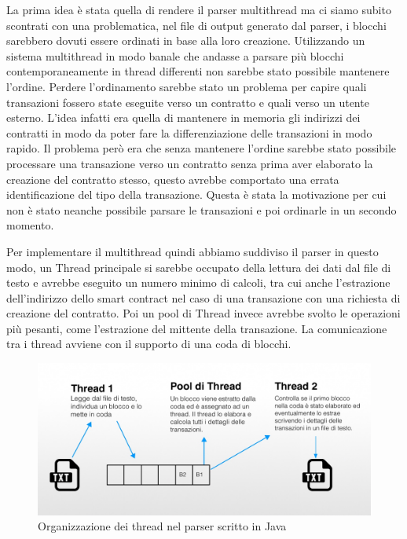 \documentclass[12pt]{report}
\begin{document}
La prima idea è stata quella di rendere il parser multithread ma ci siamo subito scontrati con una problematica, nel file di output generato dal parser, i blocchi sarebbero dovuti essere ordinati in base alla loro creazione. Utilizzando un sistema multithread in modo banale che andasse a parsare più blocchi contemporaneamente in thread differenti non sarebbe stato possibile mantenere l'ordine.
Perdere l'ordinamento sarebbe stato un problema per capire quali transazioni fossero state eseguite verso un contratto e quali verso un utente esterno. L'idea infatti era quella di mantenere in memoria gli indirizzi dei contratti in modo da poter fare la differenziazione delle transazioni in modo rapido. Il problema però era che senza mantenere l'ordine sarebbe stato possibile processare una transazione verso un contratto senza prima aver elaborato la creazione del contratto stesso, questo avrebbe comportato una errata identificazione del tipo della transazione.
Questa è stata la motivazione per cui non è stato neanche possibile parsare le transazioni e poi ordinarle in un secondo momento.

Per implementare il multithread quindi abbiamo suddiviso il parser in questo modo, un Thread principale si sarebbe occupato della lettura dei dati dal file di testo e avrebbe eseguito un numero minimo di calcoli, tra cui anche l'estrazione dell'indirizzo dello smart contract nel caso di una transazione con una richiesta di creazione del contratto.
Poi un pool di Thread invece avrebbe svolto le operazioni più pesanti, come l'estrazione del mittente della transazione.
La comunicazione tra i thread avviene con il supporto di una coda di blocchi.

\begin{figure}[H]
    \includegraphics[width=\textwidth]{Thread.jpg}
    \caption{Organizzazione dei thread nel parser scritto in Java}
\end{figure}
\end{document}
